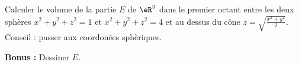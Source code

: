 \begin{exercice}\label{exocontrolecontinu0013}

Calculer le volume de la partie $E$ de $\eR^3$ dans le premier octant entre les deux sphères $x^2+y^2+z^2=1$ et $x^2+y^2+z^2=4$ et au dessus du cône $\displaystyle z=\sqrt{\frac{x^2+y^2}{2}}$. Conseil : passer aux coordonées sphèriques.  

\textbf{Bonus :} Dessiner $E$.



  
\end{exercice}

